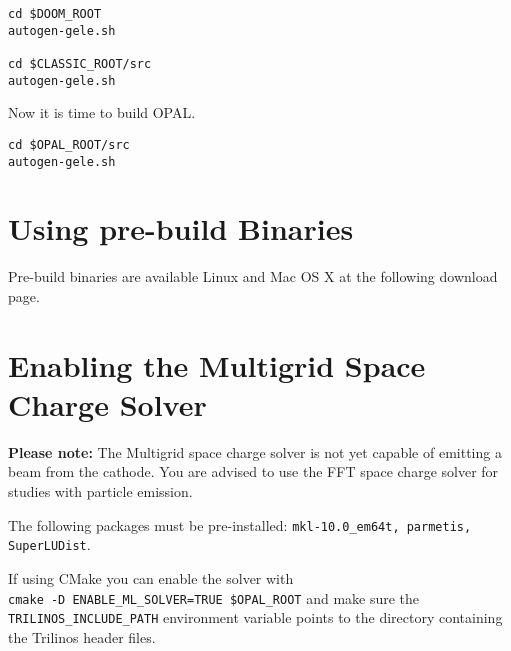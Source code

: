 \begin{footnotesize}
\begin{verbatim}
cd $DOOM_ROOT
autogen-gele.sh

cd $CLASSIC_ROOT/src
autogen-gele.sh
\end{verbatim}
\end{footnotesize}
Now it is time to build OPAL.
\begin{footnotesize}
\begin{verbatim}
cd $OPAL_ROOT/src
autogen-gele.sh
\end{verbatim}
\end{footnotesize}

\section{Using pre-build Binaries}
Pre-build binaries are available Linux and Mac OS X at the following download page. 

\section{Enabling the Multigrid Space Charge Solver}

{\bf Please note:} The Multigrid space charge solver is not yet capable of emitting a beam from the cathode.  You are advised to use the FFT space charge solver for studies
with particle emission.  

The following packages must be pre-installed: {\tt mkl-10.0\_em64t, parmetis, SuperLUDist}.

If using CMake you can enable the solver with\\ {\tt cmake -D ENABLE\_ML\_SOLVER=TRUE \$OPAL\_ROOT} and make sure the {\tt TRILINOS\_INCLUDE\_PATH} environment variable points to the directory containing the Trilinos header files.

